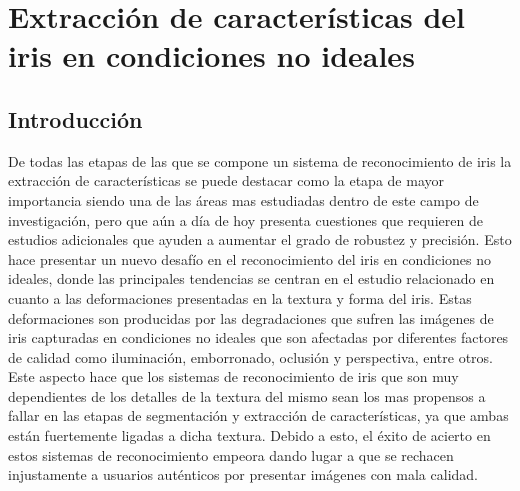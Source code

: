 
\chapter{Extracción de características del iris en condiciones no ideales} %

\label{Capítulo 5} %




\section{Introducción}

De todas las etapas de las que se compone un sistema de reconocimiento de iris la extracción de características se puede destacar como la etapa de mayor importancia siendo una de las áreas mas estudiadas dentro de este campo de investigación, pero que aún a día de hoy presenta cuestiones que requieren de estudios adicionales que ayuden a aumentar el grado de robustez y precisión. Esto hace presentar un nuevo desafío en el reconocimiento del iris en condiciones no ideales, donde las principales tendencias se centran en el estudio relacionado en cuanto a las deformaciones presentadas en la textura y forma del iris. Estas deformaciones son producidas por las degradaciones que sufren las imágenes de iris capturadas en condiciones no ideales que son afectadas por diferentes factores de calidad como iluminación, emborronado, oclusión y perspectiva, entre otros. Este aspecto hace que los sistemas de reconocimiento de iris que son muy dependientes de los detalles de la textura del mismo sean los mas propensos a fallar en las etapas de segmentación y extracción de características, ya que ambas están fuertemente ligadas a dicha textura. Debido a esto, el éxito de acierto en estos sistemas de reconocimiento empeora dando lugar a que se rechacen injustamente a usuarios auténticos por presentar imágenes con mala calidad. \\ \\


